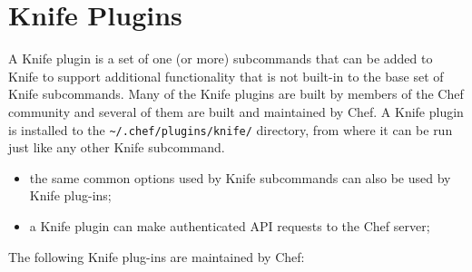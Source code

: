 \section{Knife Plugins}
\label{sec:tat-knife-plugins}

A Knife plugin is a set of one (or more) subcommands that can be added to Knife to support additional functionality that is not built-in to the base set of Knife subcommands. Many of the Knife plugins are built by members of the Chef community and several of them are built and maintained by Chef. A Knife plugin is installed to the \lstinline!~/.chef/plugins/knife/! directory, from where it can be run just like any other Knife subcommand.

\begin{itemize}
  \item the same common options used by Knife subcommands can also be used by Knife plug-ins;
  \item a Knife plugin can make authenticated API requests to the Chef server;
\end{itemize}

The following Knife plug-ins are maintained by Chef:

